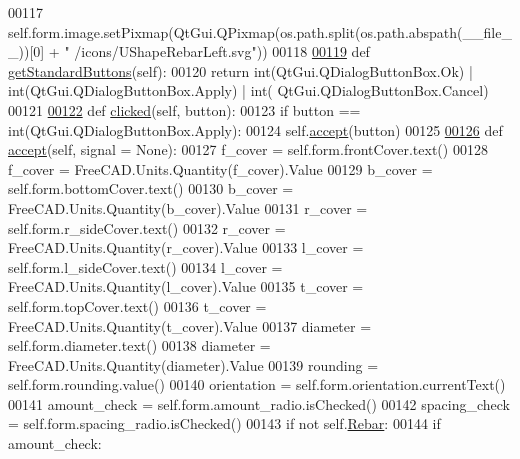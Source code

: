 \begin{DoxyCode}
00117             self.form.image.setPixmap(QtGui.QPixmap(os.path.split(os.path.abspath(\_\_file\_\_))[0] + \textcolor{stringliteral}{"
      /icons/UShapeRebarLeft.svg"}))
00118 
\hypertarget{UShapeRebar_8py_source.tex_l00119}{}\hyperlink{classUShapeRebar_1_1__UShapeRebarTaskPanel_a38ab35540a5a1657ee9c4fa2feeae575}{00119}     \textcolor{keyword}{def }\hyperlink{classUShapeRebar_1_1__UShapeRebarTaskPanel_a38ab35540a5a1657ee9c4fa2feeae575}{getStandardButtons}(self):
00120         \textcolor{keywordflow}{return} int(QtGui.QDialogButtonBox.Ok) | int(QtGui.QDialogButtonBox.Apply) | int(
      QtGui.QDialogButtonBox.Cancel)
00121 
\hypertarget{UShapeRebar_8py_source.tex_l00122}{}\hyperlink{classUShapeRebar_1_1__UShapeRebarTaskPanel_a1d59169cef16d01c4d09766255188fcb}{00122}     \textcolor{keyword}{def }\hyperlink{classUShapeRebar_1_1__UShapeRebarTaskPanel_a1d59169cef16d01c4d09766255188fcb}{clicked}(self, button):
00123         \textcolor{keywordflow}{if} button == int(QtGui.QDialogButtonBox.Apply):
00124             self.\hyperlink{classUShapeRebar_1_1__UShapeRebarTaskPanel_a9307d2a59f5d26ba7ce25b4603d78eb6}{accept}(button)
00125 
\hypertarget{UShapeRebar_8py_source.tex_l00126}{}\hyperlink{classUShapeRebar_1_1__UShapeRebarTaskPanel_a9307d2a59f5d26ba7ce25b4603d78eb6}{00126}     \textcolor{keyword}{def }\hyperlink{classUShapeRebar_1_1__UShapeRebarTaskPanel_a9307d2a59f5d26ba7ce25b4603d78eb6}{accept}(self, signal = None):
00127         f\_cover = self.form.frontCover.text()
00128         f\_cover = FreeCAD.Units.Quantity(f\_cover).Value
00129         b\_cover = self.form.bottomCover.text()
00130         b\_cover = FreeCAD.Units.Quantity(b\_cover).Value
00131         r\_cover = self.form.r\_sideCover.text()
00132         r\_cover = FreeCAD.Units.Quantity(r\_cover).Value
00133         l\_cover = self.form.l\_sideCover.text()
00134         l\_cover = FreeCAD.Units.Quantity(l\_cover).Value
00135         t\_cover = self.form.topCover.text()
00136         t\_cover = FreeCAD.Units.Quantity(t\_cover).Value
00137         diameter = self.form.diameter.text()
00138         diameter = FreeCAD.Units.Quantity(diameter).Value
00139         rounding = self.form.rounding.value()
00140         orientation = self.form.orientation.currentText()
00141         amount\_check = self.form.amount\_radio.isChecked()
00142         spacing\_check = self.form.spacing\_radio.isChecked()
00143         \textcolor{keywordflow}{if} \textcolor{keywordflow}{not} self.\hyperlink{classUShapeRebar_1_1__UShapeRebarTaskPanel_a01238597180da20c197d4c02925814f6}{Rebar}:
00144             \textcolor{keywordflow}{if} amount\_check:

\end{DoxyCode}
